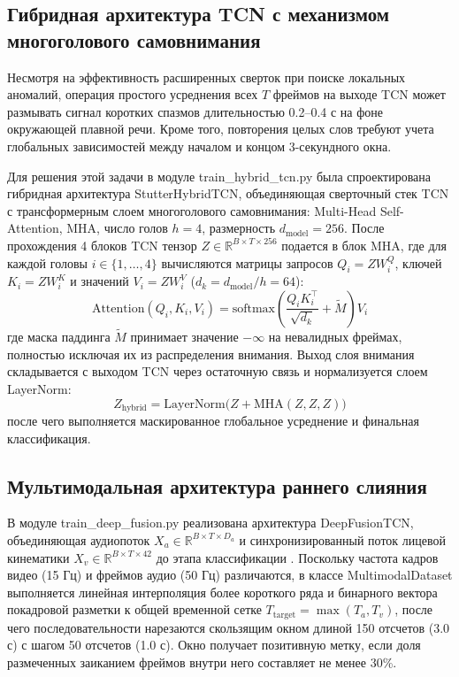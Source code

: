 \documentclass[a4paper,14pt]{extarticle}
\begin{document}
	\subsection{Гибридная архитектура TCN с механизмом многоголового самовнимания}
	Несмотря на эффективность расширенных сверток при поиске локальных аномалий, операция простого усреднения всех $T$ фреймов на выходе TCN может размывать сигнал коротких спазмов длительностью 0.2–0.4 с на фоне окружающей плавной речи. Кроме того, повторения целых слов требуют учета глобальных зависимостей между началом и концом 3-секундного окна.
	
	Для решения этой задачи в модуле train\_\allowbreak hybrid\_\allowbreak tcn.py была спроектирована гибридная архитектура StutterHybridTCN, объединяющая сверточный стек TCN с трансформерным слоем многоголового самовнимания: Multi-Head Self-Attention, MHA, число голов $h = 4$, размерность $d_{\text{model}} = 256$. После прохождения 4 блоков TCN тензор $Z \in \mathbb{R}^{B \times T \times 256}$ подается в блок MHA, где для каждой головы $i \in \{1, \dots, 4\}$ вычисляются матрицы запросов $Q_i = Z W_i^Q$, ключей $K_i = Z W_i^K$ и значений $V_i = Z W_i^V$ ($d_k = d_{\text{model}}/h = 64$):
	\begin{equation}
		\text{Attention}(Q_i, K_i, V_i) = \text{softmax}\left( \frac{Q_i K_i^\top}{\sqrt{d_k}} + \tilde{M} \right) V_i
	\end{equation}
	где маска паддинга $\tilde{M}$ принимает значение $-\infty$ на невалидных фреймах, полностью исключая их из распределения внимания. Выход слоя внимания складывается с выходом TCN через остаточную связь и нормализуется слоем LayerNorm:
	\begin{equation}
		Z_{\text{hybrid}} = \text{LayerNorm}\big( Z + \text{MHA}(Z, Z, Z) \big)
	\end{equation}
	после чего выполняется маскированное глобальное усреднение и финальная классификация.
	
	\subsection{Мультимодальная архитектура раннего слияния}
	В модуле train\_\allowbreak deep\_\allowbreak fusion.py реализована архитектура DeepFusionTCN, объединяющая аудиопоток $X_a \in \mathbb{R}^{B \times T \times D_a}$ и синхронизированный поток лицевой кинематики $X_v \in \mathbb{R}^{B \times T \times 42}$ до этапа классификации \cite{ivankin, tcn}. Поскольку частота кадров видео (15 Гц) и фреймов аудио (50 Гц) различаются, в классе MultimodalDataset выполняется линейная интерполяция более короткого ряда и бинарного вектора покадровой разметки к общей временной сетке $T_{\text{target}} = \max(T_a, T_v)$, после чего последовательности нарезаются скользящим окном длиной 150 отсчетов (3.0 с) с шагом 50 отсчетов (1.0 с). Окно получает позитивную метку, если доля размеченных заиканием фреймов внутри него составляет не менее 30\%.
	
\end{document}
